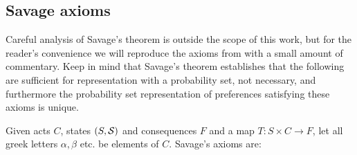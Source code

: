 \subsection{Savage axioms}\label{sec:savage_axioms}

Careful analysis of Savage's theorem is outside the scope of this work, but for the reader's convenience we will reproduce the axioms from \citet{savage_foundations_1954} with a small amount of commentary. Keep in mind that Savage's theorem establishes that the following are sufficient for representation with a probability set, not necessary, and furthermore the probability set representation of preferences satisfying these axioms is unique.

Given acts $C$, states $(S,\mathcal{S})$ and consequences $F$ and a map $T:S\times C\to F$, let all greek letters $\alpha,\beta$ etc. be elements of $C$. Savage's axioms are:
